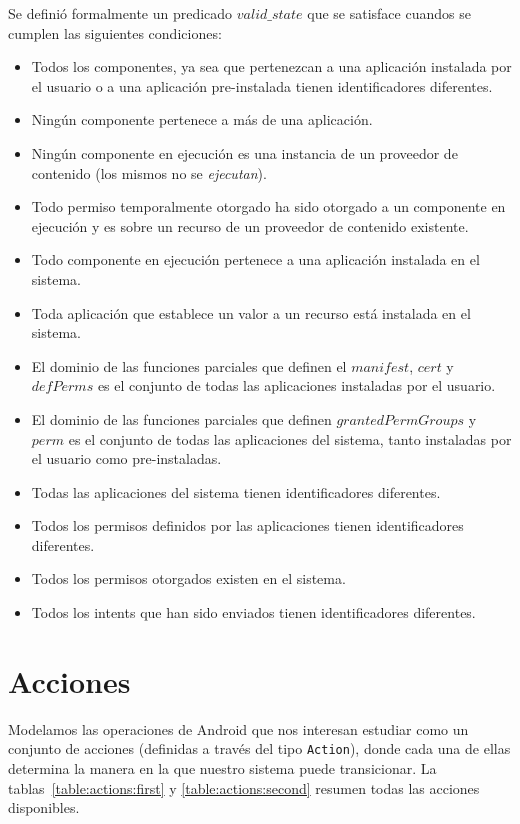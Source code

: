 Se definió formalmente un predicado $valid\_state$ que se satisface cuandos se cumplen las
siguientes condiciones:

\begin{itemize}
    \item Todos los componentes, ya sea que pertenezcan a una aplicación instalada por el usuario o
          a una aplicación pre-instalada tienen identificadores diferentes.
    \item Ningún componente pertenece a más de una aplicación.
    \item Ningún componente en ejecución es una instancia de un proveedor de contenido (los mismos
          no se \textit{ejecutan}).
    \item Todo permiso temporalmente otorgado ha sido otorgado a un componente en ejecución y es
          sobre un recurso de un proveedor de contenido existente.
    \item Todo componente en ejecución pertenece a una aplicación instalada en el sistema.
    \item Toda aplicación que establece un valor a un recurso está instalada en el sistema.
    \item El dominio de las funciones parciales que definen el $manifest$, $cert$ y $defPerms$ es el
          conjunto de todas las aplicaciones instaladas por el usuario.
    \item El dominio de las funciones parciales que definen $grantedPermGroups$ y $perm$ es el
          conjunto de todas las aplicaciones del sistema, tanto instaladas por el usuario como
          pre-instaladas.
    \item Todas las aplicaciones del sistema tienen identificadores diferentes.
    \item Todos los permisos definidos por las aplicaciones tienen identificadores diferentes.
    \item Todos los permisos otorgados existen en el sistema.
    \item Todos los intents que han sido enviados tienen identificadores diferentes.
\end{itemize}

\section{Acciones}
Modelamos las operaciones de Android que nos interesan estudiar como un conjunto de acciones
(definidas a través del tipo \texttt{Action}), donde cada una de ellas determina la manera en la que
nuestro sistema puede transicionar.  La tablas~\ref{table:actions:first} y
\ref{table:actions:second} resumen todas las acciones disponibles.


